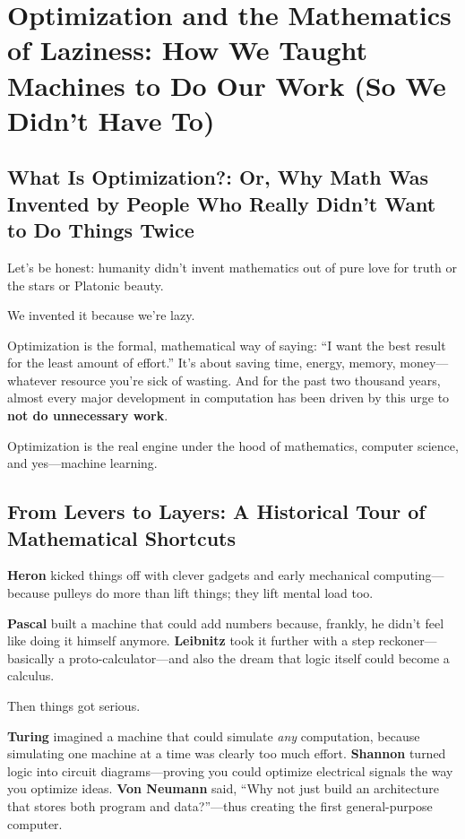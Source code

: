 \section{Optimization and the Mathematics of Laziness: How We Taught Machines to Do Our Work (So We Didn’t Have To)}

\subsection{What Is Optimization?: Or, Why Math Was Invented by People Who Really Didn’t Want to Do Things Twice}

Let’s be honest: humanity didn’t invent mathematics out of pure love for truth or the stars or Platonic beauty.

We invented it because we’re lazy.

Optimization is the formal, mathematical way of saying: “I want the best result for the least amount of effort.” It’s about saving time, energy, memory, money—whatever resource you’re sick of wasting. And for the past two thousand years, almost every major development in computation has been driven by this urge to \textbf{not do unnecessary work}.

Optimization is the real engine under the hood of mathematics, computer science, and yes—machine learning.

\subsection{From Levers to Layers: A Historical Tour of Mathematical Shortcuts}

\textbf{Heron} kicked things off with clever gadgets and early mechanical computing—because pulleys do more than lift things; they lift mental load too.

\textbf{Pascal} built a machine that could add numbers because, frankly, he didn’t feel like doing it himself anymore.  
\textbf{Leibnitz} took it further with a step reckoner—basically a proto-calculator—and also the dream that logic itself could become a calculus.

Then things got serious.

\textbf{Turing} imagined a machine that could simulate \emph{any} computation, because simulating one machine at a time was clearly too much effort.  
\textbf{Shannon} turned logic into circuit diagrams—proving you could optimize electrical signals the way you optimize ideas.  
\textbf{Von Neumann} said, “Why not just build an architecture that stores both program and data?”—thus creating the first general-purpose computer.

